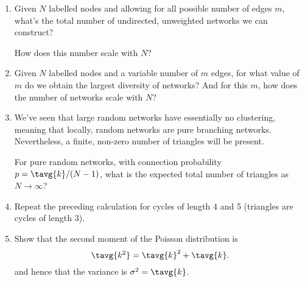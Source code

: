 \begin{enumerate}

   \solutionend



\item
  Given $N$ labelled nodes and allowing for
  all possible number of edges $m$, what's the
  total number of undirected, unweighted
  networks we can construct?

  How does this number scale with $N$?

  
  
   \solutionstart


   \solutionend

\item
  Given $N$ labelled nodes and a variable number of $m$ edges,
  for what value of $m$ do we obtain the largest diversity
  of networks?  And for this $m$, how does the number
  of networks scale with $N$?

  
   \solutionstart


   \solutionend



\item
  We've seen that large random networks have 
  essentially no clustering, meaning that locally,
  random networks are pure branching networks.
  Nevertheless, a finite, non-zero number
  of triangles will be present.
  
  For pure random networks, with connection probability
  $p = \tavg{k}/(N-1)$, what is the expected total number
  of triangles as $N \rightarrow \infty$?

  
   \solutionstart


   \solutionend


\item

  Repeat the preceding calculation for cycles of length 4 and 5
  (triangles are cycles of length 3).

  
   \solutionstart


   \solutionend



\item
  Show that the second moment of the Poisson distribution
  is  
  $$
  \tavg{k^{2}} = \tavg{k}^{2} + \tavg{k}.
  $$
  and hence that the variance is $\sigma^{2} = \tavg{k}$.


\end{enumerate}
